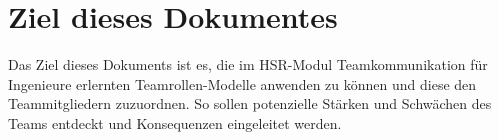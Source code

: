 
\chapter{Ziel dieses Dokumentes}

Das Ziel dieses Dokuments ist es, die im HSR-Modul Teamkommunikation für Ingenieure erlernten Teamrollen-Modelle anwenden zu können und diese den Teammitgliedern zuzuordnen. So sollen potenzielle Stärken und Schwächen des Teams entdeckt und Konsequenzen eingeleitet werden. 
